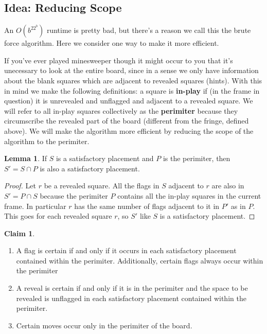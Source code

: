 \documentclass{article}
\theoremstyle{definition}
\theoremstyle{definition}
\theoremstyle{theorem}
\newtheorem{claim}{Claim}
\newtheorem*{lemma}{Lemma}
\begin{document}
	 \subsection{Idea: Reducing Scope}
	 An $O(b^22^{b})$ runtime is pretty bad, but there's a reason we call this the brute force algorithm. Here we consider one way to make it more efficient.
	 
	 If you've ever played minesweeper though it might occur to you that it's unecessary to look at the entire board, since in a sense we only have information about the blank squares which are adjacent to revealed squares (hints). With this in mind we make the following definitions: a square is \textbf{in-play} if (in the frame in question) it is unrevealed and unflagged and adjacent to a revealed square. We will refer to all in-play squares collectively as the \textbf{perimiter} because they circumscribe the revealed part of the board (different from the fringe, defined above). We will make the algorithm more efficient by reducing the scope of the algorithm to the perimiter.
	
	\begin{lemma}
		If $S$ is a satisfactory placement and $P$ is the perimiter,  then $S' = S \cap P$ is also a satisfactory placement.
	\end{lemma}

	\begin{proof}
		Let $r$ be a revealed square. All the flags in $S$ adjacent to $r$ are also in $S' = P \cap S$ because the perimiter $P$ contains all the in-play squares in the current frame. In particular $r$ has the same number of flags adjacent to it in $P'$ as in $P$. This goes for each revealed square $r$, so $S'$ like $S$ is a satisfactory placement.
	\end{proof}
	\begin{claim}
		
		
		\begin{enumerate}
		
		\item
		A flag is certain if and only if it occurs in each satisfactory placement contained within the perimiter. Additionally, certain flags always occur within the perimiter
		
		\item
		A reveal is certain if and only if it is in the perimiter and the space to be revealed is unflagged in each satisfactory placement contained within the perimiter.
		
		\item
		Certain moves occur only in the perimiter of the board.
		\end{enumerate}
	\end{claim}
\end{document}
